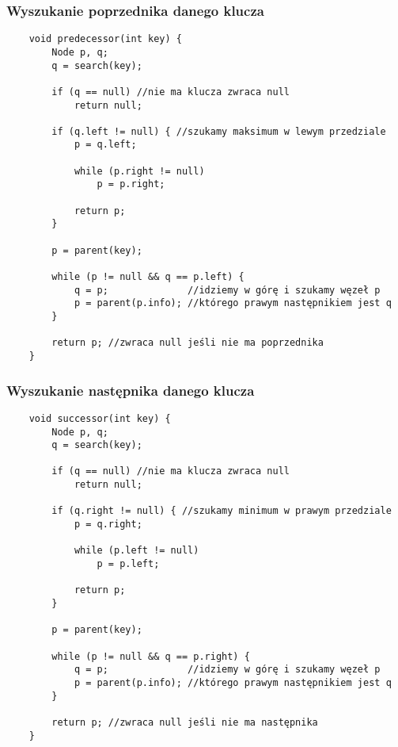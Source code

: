 \documentclass[algorytmy.tex]{subfiles}
\begin{document}
\subsubsection{Wyszukanie poprzednika danego klucza}
\begin{verbatim}
    void predecessor(int key) {
        Node p, q;
        q = search(key);

        if (q == null) //nie ma klucza zwraca null
            return null;

        if (q.left != null) { //szukamy maksimum w lewym przedziale
            p = q.left;

            while (p.right != null)
                p = p.right;

            return p;
        }

        p = parent(key);

        while (p != null && q == p.left) {
            q = p;              //idziemy w górę i szukamy węzeł p
            p = parent(p.info); //którego prawym następnikiem jest q
        }

        return p; //zwraca null jeśli nie ma poprzednika
    }
\end{verbatim}

\subsubsection{Wyszukanie następnika danego klucza}
\begin{verbatim}
    void successor(int key) {
        Node p, q;
        q = search(key);

        if (q == null) //nie ma klucza zwraca null
            return null;

        if (q.right != null) { //szukamy minimum w prawym przedziale
            p = q.right;

            while (p.left != null)
                p = p.left;

            return p;
        }

        p = parent(key);

        while (p != null && q == p.right) {
            q = p;              //idziemy w górę i szukamy węzeł p
            p = parent(p.info); //którego prawym następnikiem jest q
        }

        return p; //zwraca null jeśli nie ma następnika
    }
\end{verbatim}

\pagebreak
\end{document}
